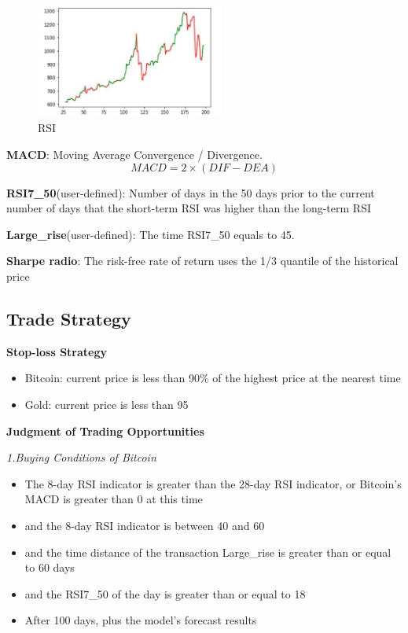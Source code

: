 \documentclass[12pt]{article}
\begin{document}
    \begin{figure}[H]
        \centering
        \includegraphics[width=0.55\textwidth]{trade_strategy_1.jpg}
        \caption{RSI}
        \label{fig:rsi}
    \end{figure}
    
    \noindent\textbf{MACD}: Moving Average Convergence / Divergence. \[MACD=2\times(DIF-DEA)\]
    
    \noindent\textbf{RSI7\_50}(user-defined): Number of days in the 50 days prior to the current number of days that the short-term RSI was higher than the long-term RSI
    
    \noindent\textbf{Large\_rise}(user-defined): The time RSI7\_50 equals to 45.
    
    \noindent\textbf{Sharpe radio}: The risk-free rate of return uses the 1/3 quantile of the historical price
    
    \subsection{Trade Strategy}
    
    \noindent\textbf{Stop-loss Strategy}
    
    \begin{itemize}
        \item Bitcoin: current price is less than 90\% of the highest price at the nearest time
        \item Gold: current price is less than 95%
    \end{itemize}
    
    \noindent\textbf{Judgment of Trading Opportunities}
    
    \textit{1.Buying Conditions of Bitcoin}
    \begin{itemize}
        \item The 8-day RSI indicator is greater than the 28-day RSI indicator, or Bitcoin's MACD is greater than 0 at this time
        \item and the 8-day RSI indicator is between 40 and 60
        \item and the time distance of the transaction Large\_rise is greater than or equal to 60 days
        \item and the RSI7\_50 of the day is greater than or equal to 18
        \item After 100 days, plus the model's forecast results
    \end{itemize}
    
\end{document}
